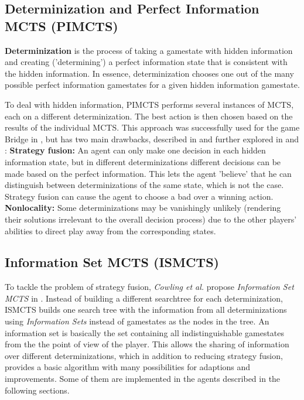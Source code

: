 \subsection{Determinization and Perfect Information MCTS (PIMCTS)}
\textbf{Determinization} is the process of taking a gamestate with hidden information and creating ('determining') a perfect information state that is consistent with the hidden information. In essence, determinization chooses one out of the many possible perfect information gamestates for a given hidden information gamestate.

To deal with hidden information, PIMCTS performs several instances of MCTS, each on a different determinization. The best action is then chosen based on the results of the individual MCTS.
This approach was successfully used for the game Bridge in \cite{bridge}, but has two main drawbacks, described in \cite{bridge} and further explored in \cite{pimcts} and \cite{ismcts}:
\newline\textbf{Strategy fusion:} An agent can only make one decision in each hidden information state, but in different determinizations different decisions can be made based on the perfect information. This lets the agent 'believe' that he can distinguish between determinizations of the same state, which is not the case. Strategy fusion can cause the agent to choose a bad over a winning action.
\newline\textbf{Nonlocality:} Some determinizations may be vanishingly unlikely (rendering their solutions irrelevant to the overall decision process) due to the other players’ abilities to direct play away from the corresponding states.

\subsection{Information Set MCTS (ISMCTS)}
To tackle the problem of strategy fusion, \textit{Cowling et al.} propose \textit{Information Set MCTS} in \cite{ismcts}. Instead of building a different searchtree for each determinization, ISMCTS builds one search tree with the information from all determinizations using \textit{Information Sets} instead of gamestates as the nodes in the tree. An information set is basically the set containing all indistinguishable gamestates from the the point of view of the player. This allows the sharing of information over different determinizations, which in addition to reducing strategy fusion, provides a basic algorithm with many possibilities for adaptions and improvements. Some of them are implemented in the agents described in the following sections.


